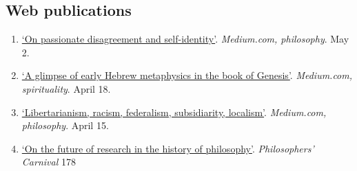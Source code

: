 \subsection{Web publications}
\begin{enumerate}
	\setcounter{enumi}{\value{publicationCounter}}	%

	\item \datedsubsectionnarrow{}
{}
{
	\href{https://medium.com/philosophy-outside-the-text/on-passionate-disagreement-and-self-identity-f391bc79a6a}{`On passionate disagreement and self-identity'}. \emph{Medium.com, philosophy}. May 2.}
{}
	\item \datedsubsectionnarrow{}
{}
{
	\href{https://medium.com/philosophy-outside-the-text/a-glimpse-of-early-hebrew-metaphysics-in-the-book-of-genesis-892adee25501}{`A glimpse of early Hebrew metaphysics in the book of Genesis'}. 		\emph{Medium.com, spirituality}. April 18.}
{}
	\item \datedsubsectionnarrow{}
{}
{
	\href{https://medium.com/@jacobarchambault/libertarianism-racism-federalism-subsidiarity-localism-a3c3fbde1d78}{`Libertarianism, racism, federalism, subsidiarity, localism'}. 		\emph{Medium.com, philosophy}. April 15.}
{}
	\item {}
{}
{
	\href{https://branemrys.blogspot.com/2015/08/philosophers-carnival-178.html}{`On the future of research in the history of philosophy'}. \emph{Philosophers' Carnival} 178}
{}
	\setcounter{publicationCounter}{\value{enumi}}	%
\end{enumerate}
